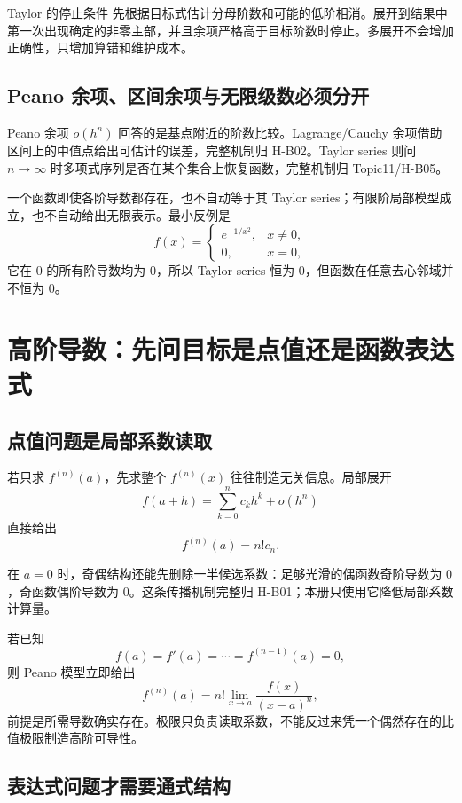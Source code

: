 \documentclass[11pt,a4paper]{ctexart}
\begin{document}
\begin{corebox}{Taylor 的停止条件}
先根据目标式估计分母阶数和可能的低阶相消。展开到结果中第一次出现确定的非零主部，并且余项严格高于目标阶数时停止。多展开不会增加正确性，只增加算错和维护成本。
\end{corebox}

\subsection{Peano 余项、区间余项与无限级数必须分开}

Peano 余项 $o(h^n)$ 回答的是基点附近的阶数比较。Lagrange/Cauchy 余项借助区间上的中值点给出可估计的误差，完整机制归 H-B02。Taylor series 则问 $n\to\infty$ 时多项式序列是否在某个集合上恢复函数，完整机制归 Topic11/H-B05。

一个函数即使各阶导数都存在，也不自动等于其 Taylor series；有限阶局部模型成立，也不自动给出无限表示。最小反例是
\[
f(x)=
\begin{cases}
e^{-1/x^2},&x\ne0,\\
0,&x=0,
\end{cases}
\]
它在 $0$ 的所有阶导数均为 $0$，所以 Taylor series 恒为 $0$，但函数在任意去心邻域并不恒为 $0$。

\section{高阶导数：先问目标是点值还是函数表达式}

\subsection{点值问题是局部系数读取}

若只求 $f^{(n)}(a)$，先求整个 $f^{(n)}(x)$ 往往制造无关信息。局部展开
\[
f(a+h)=\sum_{k=0}^{n}c_k h^k+o(h^n)
\]
直接给出
\[
f^{(n)}(a)=n!c_n.
\]

在 $a=0$ 时，奇偶结构还能先删除一半候选系数：足够光滑的偶函数奇阶导数为 $0$，奇函数偶阶导数为 $0$。这条传播机制完整归 H-B01；本册只使用它降低局部系数计算量。

若已知
\[
f(a)=f'(a)=\cdots=f^{(n-1)}(a)=0,
\]
则 Peano 模型立即给出
\[
f^{(n)}(a)=n!\lim_{x\to a}\frac{f(x)}{{(x-a)}^n},
\]
前提是所需导数确实存在。极限只负责读取系数，不能反过来凭一个偶然存在的比值极限制造高阶可导性。

\subsection{表达式问题才需要通式结构}
\end{document}
